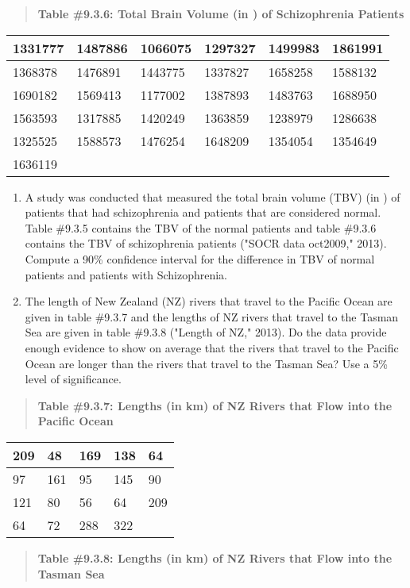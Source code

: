 \documentclass[]{book}
\begin{document}
\begin{quote}
\textbf{Table \#9.3.6: Total Brain Volume (in ) of Schizophrenia Patients}
\end{quote}

\begin{longtable}[]{@{}llllll@{}}
\toprule
1331777 & 1487886 & 1066075 & 1297327 & 1499983 & 1861991\tabularnewline
\midrule
\endhead
1368378 & 1476891 & 1443775 & 1337827 & 1658258 & 1588132\tabularnewline
1690182 & 1569413 & 1177002 & 1387893 & 1483763 & 1688950\tabularnewline
1563593 & 1317885 & 1420249 & 1363859 & 1238979 & 1286638\tabularnewline
1325525 & 1588573 & 1476254 & 1648209 & 1354054 & 1354649\tabularnewline
1636119 & & & & &\tabularnewline
\bottomrule
\end{longtable}

\begin{enumerate}
\def\labelenumi{\arabic{enumi}.}
\setcounter{enumi}{3}
\item
  A study was conducted that measured the total brain volume (TBV) (in ) of patients that had schizophrenia and patients that are considered normal. Table \#9.3.5 contains the TBV of the normal patients and table \#9.3.6 contains the TBV of schizophrenia patients ("SOCR data oct2009," 2013). Compute a 90\% confidence interval for the difference in TBV of normal patients and patients with Schizophrenia.
\item
  The length of New Zealand (NZ) rivers that travel to the Pacific Ocean are given in table \#9.3.7 and the lengths of NZ rivers that travel to the Tasman Sea are given in table \#9.3.8 ("Length of NZ," 2013). Do the data provide enough evidence to show on average that the rivers that travel to the Pacific Ocean are longer than the rivers that travel to the Tasman Sea? Use a 5\% level of significance.
\end{enumerate}

\begin{quote}
\textbf{Table \#9.3.7: Lengths (in km) of NZ Rivers that Flow into the
Pacific Ocean}
\end{quote}

\begin{longtable}[]{@{}lllll@{}}
\toprule
209 & 48 & 169 & 138 & 64\tabularnewline
\midrule
\endhead
97 & 161 & 95 & 145 & 90\tabularnewline
121 & 80 & 56 & 64 & 209\tabularnewline
64 & 72 & 288 & 322 &\tabularnewline
\bottomrule
\end{longtable}

\begin{quote}
\textbf{Table \#9.3.8: Lengths (in km) of NZ Rivers that Flow into the
Tasman Sea}
\end{quote}
\end{document}

